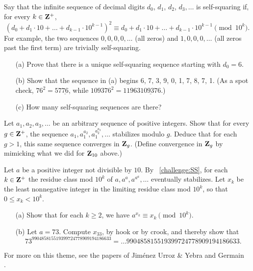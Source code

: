 \begin{challenge} Say that the infinite sequence of decimal digits $d_0$, $d_1$, $d_2$, $d_3, \dots$ is \textsf{self-squaring} if, for every $k \in \mathbf{Z}^{+}$, \[ (d_0 + d_1 \cdot 10 + \dots + d_{k-1} \cdot 10^{k-1})^2 \equiv d_0 + d_1 \cdot 10 + \dots + d_{k-1}\cdot 10^{k-1} \pmod{10^k}. \]
For example, the two sequences $0,0,0,0,\dots$ (all zeros) and $1,0,0,0,\dots$ (all zeros past the first term) are trivially self-squaring.
\begin{enumerate}
\vspace{-0.12in}
\item[(a)] Prove that there is a unique self-squaring sequence starting with $d_0=6$.
\item[(b)] Show that the sequence in (a) begins 6, 7, 3, 9, 0, 1, 7, 8, 7, 1. (As a spot check, $76^2 = 57\underline{76}$, while $109376^2= 11963\underline{109376}$.)
\item[(c)] How many self-squaring sequences are there?
\end{enumerate}
\end{challenge}




\begin{challenge}\label{challenge:SS} Let $a_1, a_2, a_3, \dots$ be an arbitrary sequence of positive integers. Show that for every $g\in\mathbf{Z}^{+}$, the sequence $a_1, a_1^{a_2}, a_1^{a_2^{a_3}}, \dots$ stabilizes modulo $g$. Deduce that for each $g>1$, this same sequence converges in $\mathbf{Z}_g$. (Define convergence in $\mathbf{Z}_g$ by mimicking what we did for $\mathbf{Z}_{10}$ above.) 
\end{challenge}

\begin{challenge}[continuation]
Let $a$ be a positive integer not divisible by $10$. By \pp~\ref{challenge:SS},  for each $k\in \mathbf{Z}^{+}$ the residue class mod $10^k$ of $a, a^a, a^{a^{a}},\dots$ eventually stabilizes. Let $x_k$ be the least nonnegative integer in the limiting residue class mod $10^k$, so that $0 \le x_k < 10^k$. 
\begin{enumerate}
\vspace{-0.12in}
\item[(a)] Show that for each $k\ge 2$, we have $a^{x_k} \equiv x_k\pmod{10^k}$.
\item[(b)] Let $a=73$. Compute $x_{33}$, by hook or by crook, and thereby show that
\[ 73^{990485815519399724778909194186633} = \dots990485815519399724778909194186633.\]
\end{enumerate}
\vspace{-0.10in}
For more on this theme, see the papers of Jim\'enez Urroz \& Yebra \cite{UY} and Germain~ \cite{germain}.
\end{challenge}

